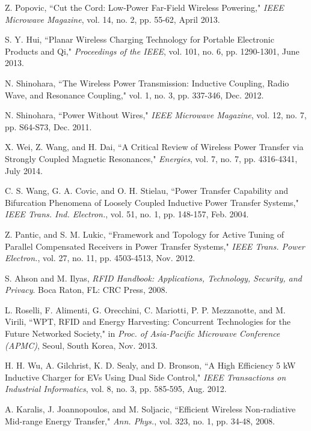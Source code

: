 \documentclass[twocolumn,10pt]{IEEEtran}
\begin{document}
\begin{thebibliography}{99}
 Z. Popovic, ``Cut the Cord: Low-Power Far-Field Wireless Powering," \emph{IEEE Microwave Magazine}, vol. 14, no. 2, pp. 55-62, April 2013.


S. Y. Hui, ``Planar Wireless Charging Technology for Portable Electronic Products and Qi,"  
\emph{Proceedings of the IEEE}, vol. 101, no. 6, pp. 1290-1301, June 2013.

N. Shinohara, ``The Wireless Power Transmission: Inductive Coupling, Radio Wave, and Resonance Coupling," vol. 1, no. 3, pp. 337-346, Dec. 2012.

N. Shinohara, ``Power Without Wires," 
\emph{IEEE Microwave Magazine}, 
vol. 12, no. 7, pp. S64-S73, Dec. 2011. 


X. Wei, Z. Wang, and H. Dai, ``A Critical Review of Wireless Power Transfer via Strongly Coupled Magnetic Resonances," \emph{Energies}, vol. 7, no. 7, pp. 4316-4341,  July 2014. 

C. S. Wang,  G. A. Covic, and O. H. Stielau, ``Power Transfer Capability and Bifurcation Phenomena of Loosely Coupled Inductive Power Transfer Systems," \emph{IEEE Trans. Ind. Electron.}, vol. 51, no. 1, pp. 148-157, Feb. 2004.

Z. Pantic, and S. M. Lukic, ``Framework and Topology for Active Tuning of Parallel Compensated Receivers in Power Transfer Systems," \emph{IEEE Trans. Power Electron.}, vol. 27, no. 11, pp. 4503-4513, Nov. 2012.

S. Ahson and M. Ilyas, \emph{RFID Handbook: Applications, Technology,
Security, and Privacy}. Boca Raton, FL: CRC Press, 2008.

L. Roselli, F. Alimenti, G. Orecchini, C. Mariotti, P. P. Mezzanotte, and M. Virili, ``WPT, RFID and Energy Harvesting: Concurrent Technologies for the Future Networked Society," in \emph{Proc. of Asia-Pacific Microwave Conference (APMC)}, Seoul, South Korea, Nov. 2013.

H. H. Wu, A. Gilchrist, K. D. Sealy, and D. Bronson, ``A High Efficiency 5 kW Inductive Charger for EVs Using Dual Side Control," \emph{IEEE Transactions on Industrial Informatics}, vol. 8, no. 3, pp. 585-595, Aug. 2012.

	

A. Karalis, J. Joannopoulos, and M. Soljacic, ``Efficient Wireless
Non-radiative Mid-range Energy Transfer," \emph{Ann. Phys.}, vol. 323, no. 1, pp. 34-48, 2008.



\end{thebibliography}
\end{document}
